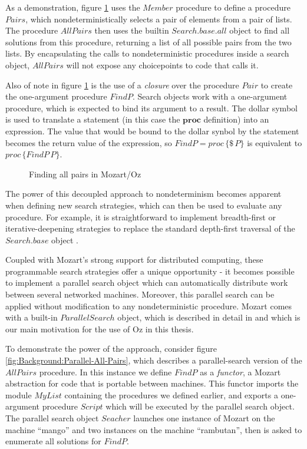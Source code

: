As a demonstration, figure \ref{fig:Background:All-Pairs} uses the
$Member$ procedure to define a procedure $Pairs$, which nondeterministically
selects a pair of elements from a pair of lists. The procedure $AllPairs$
then uses the builtin $Search.base.all$ object to find all solutions
from this procedure, returning a list of all possible pairs from the
two lists. By encapsulating the calls to nondeterministic procedures
inside a search object, $AllPairs$ will not expose any choicepoints
to code that calls it.

Also of note in figure \ref{fig:Background:All-Pairs} is the use
of a \emph{closure} over the procedure $Pair$ to create the one-argument
procedure $FindP$. Search objects work with a one-argument procedure,
which is expected to bind its argument to a result. The dollar symbol
is used to translate a statement (in this case the $\mathbf{proc}$
definition) into an expression. The value that would be bound to the
dollar synbol by the statement becomes the return value of the expression,
so $FindP=proc\,\{\$\, P\}$ is equivalent to $proc\,\{FindP\, P\}$.

%
\begin{figure}[t]

\caption{Finding all pairs in Mozart/Oz\label{fig:Background:All-Pairs}}

\end{figure}


The power of this decoupled approach to nondeterminism becomes apparent
when defining new search strategies, which can then be used to evaluate
any procedure. For example, it is straightforward to implement breadth-first
or iterative-deepening strategies to replace the standard depth-first
traversal of the $Search.base$ object \citep{schulte00constraint_services}.

Coupled with Mozart's strong support for distributed computing, these
programmable search strategies offer a unique opportunity - it becomes
possible to implement a parallel search object which can automatically
distribute work between several networked machines. Moreover, this
parallel search can be applied without modification to any nondeterministic
procedure. Mozart comes with a built-in $ParallelSearch$ object,
which is described in detail in \citep{schulte00oz_parallel} and
which is our main motivation for the use of Oz in this thesis.

To demonstrate the power of the approach, consider figure \ref{fig:Background:Parallel-All-Pairs},
which describes a parallel-search version of the $AllPairs$ procedure.
In this instance we define $FindP$ as a \emph{functor}, a Mozart
abstraction for code that is portable between machines. This functor
imports the module $MyList$ containing the procedures we defined
earlier, and exports a one-argument procedure $Script$ which will
be executed by the parallel search object. The parallel search object
$Seacher$ launches one instance of Mozart on the machine {}``mango''
and two instances on the machine {}``rambutan'', then is asked to
enumerate all solutions for $FindP$.

